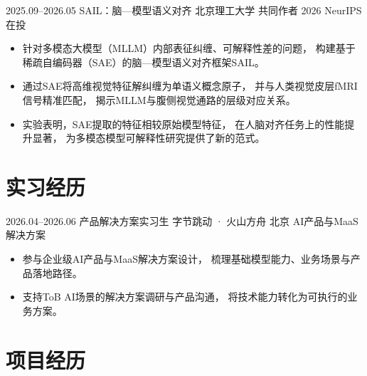 \documentclass[10pt,a4paper,sans]{moderncv}
\begin{document}
\cventry
  {2025.09--2026.05}
  {SAIL：脑—模型语义对齐}
  {北京理工大学}
  {共同作者}
  {2026 NeurIPS在投}
  {
    \begin{itemize}
      \item 针对多模态大模型（MLLM）内部表征纠缠、可解释性差的问题，
      构建基于稀疏自编码器（SAE）的脑—模型语义对齐框架SAIL。
      \item 通过SAE将高维视觉特征解纠缠为单语义概念原子，
      并与人类视觉皮层fMRI信号精准匹配，
      揭示MLLM与腹侧视觉通路的层级对应关系。
      \item 实验表明，SAE提取的特征相较原始模型特征，
      在人脑对齐任务上的性能提升显著，
      为多模态模型可解释性研究提供了新的范式。
    \end{itemize}
  }


\section{实习经历}

\cventry
  {2026.04--2026.06}
  {产品解决方案实习生}
  {字节跳动 · 火山方舟}
  {北京}
  {AI产品与MaaS解决方案}
  {
    \begin{itemize}
      \item 参与企业级AI产品与MaaS解决方案设计，
      梳理基础模型能力、业务场景与产品落地路径。
      \item 支持ToB AI场景的解决方案调研与产品沟通，
      将技术能力转化为可执行的业务方案。
    \end{itemize}
  }


\clearpage
\section{项目经历}
\end{document}
